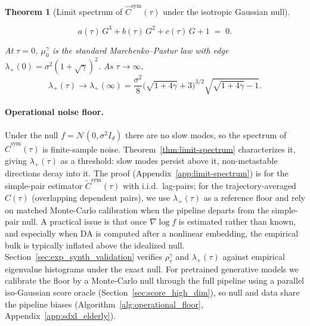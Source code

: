 \documentclass{article}
\newtheorem{theorem}{Theorem}
\begin{document}
\begin{theorem}[Limit spectrum of $\hat C^{\mathrm{sym}}(\tau)$ under the isotropic Gaussian null]
\begin{enumerate}[label=(\roman*),leftmargin=*,nosep]
\begin{equation}
a(\tau)\,G^3 + b(\tau)\,G^2 + c(\tau)\,G + 1 \;=\; 0.
\label{eq:stieltjes-cubic}
\end{equation}
\end{enumerate}
At $\tau = 0$, $\mu_0^\gamma$ is the standard Marchenko--Pastur law with edge $\lambda_+(0) = \sigma^2(1+\sqrt\gamma)^2$. As $\tau \to \infty$,
\begin{equation}
\lambda_+(\tau) \to \lambda_+(\infty) = \frac{\sigma^2}{8}\bigl(\sqrt{1+4\gamma}+3\bigr)^{3/2}\sqrt{\sqrt{1+4\gamma}-1}.
\label{eq:edge-tauinf-main}
\end{equation}
\end{theorem}

\paragraph{Operational noise floor.}\noindent\label{rem:floor-scope}
Under the null $f = \mathcal{N}(0, \sigma^2 I_d)$ there are no slow
modes, so the spectrum of $\hat C^{\mathrm{sym}}(\tau)$ is finite-sample
noise. Theorem~\ref{thm:limit-spectrum} characterizes it, giving
$\lambda_+(\tau)$ as a threshold: slow modes persist above it,
non-metastable directions decay into it. The proof (Appendix~\ref{app:limit-spectrum}) is for the simple-pair estimator $\widetilde C^{\mathrm{sym}}(\tau)$ with i.i.d.\ lag-pairs; for the trajectory-averaged $\hat C(\tau)$ (overlapping dependent pairs), we use $\lambda_+(\tau)$ as a reference floor and rely on matched Monte-Carlo calibration when the pipeline departs from the simple-pair null. A practical issue is that once $\nabla \log f$ is estimated rather than
known, and especially when DA is computed after a nonlinear embedding,
the empirical bulk is typically inflated above the idealized null. Section~\ref{sec:exp_synth_validation} verifies $\rho_\tau^\gamma$ and $\lambda_+(\tau)$ against empirical eigenvalue histograms under the exact null. For pretrained generative models we calibrate the floor by a
Monte-Carlo null through the full pipeline using a parallel iso-Gaussian
score oracle (Section~\ref{sec:score_high_dim}), so null and data
share the pipeline biases
(Algorithm~\ref{alg:operational_floor},
Appendix~\ref{app:sdxl_elderly}). 
\end{document}
